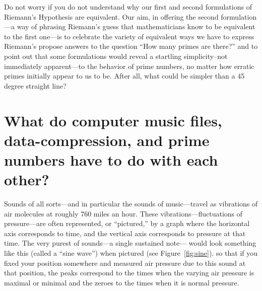 \documentclass[11pt]{article}
\theoremstyle{plain}
\theoremstyle{definition}
\numberwithin{equation}{section}
\numberwithin{figure}{section}
\numberwithin{table}{section}
\begin{document}
          \begin{center}
\end{center}

Do not worry if you do not understand why our first and second
formulations of Riemann's Hypothesis are equivalent. Our aim, in
offering the second formulation---a way of phrasing Riemann's guess
that mathematicians know to be equivalent to the first one---is to
celebrate the variety of equivalent ways we have to express Riemann's
propose answers to the question ``How many primes are there?'' and to
point out that some formulations would reveal a startling
simplicity--not immediately apparent---to the behavior of prime
numbers, no matter how erratic primes initially appear to us to
be. After all, what could be simpler than a 45 degree straight line?
 
 \bigskip


\section{What do  computer music files,  data-compression, and prime numbers have to do with each other?}

\bigskip


Sounds of all sorts---and in particular the sounds of music---travel
as vibrations of air molecules at roughly 760 miles an hour. These
vibrations---fluctuations of pressure---are often represented, or
``pictured,'' by a graph where the horizontal axis corresponds to
time, and the vertical axis corresponds to pressure at that time.  The
very purest of sounds---a single sustained note--- would look
something like this (called a ``sine wave'') when pictured (see
Figure~\ref{fig:sine}).  so that if you fixed your position somewhere
and measured air pressure due to this sound at that position, the
peaks correspond to the times when the varying air pressure is maximal
or minimal and the zeroes to the times when it is normal pressure.
\end{document}
